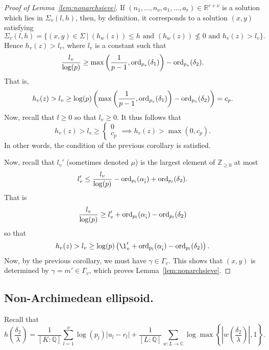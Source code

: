 \begin{proof}[Proof of Lemma~\ref{lem:nonarchsieve}]
If $(n_1, \dots, n_{\nu}, a_1, \dots, a_r) \in \mathbb{R}^{r+\nu}$ is a solution which lies in $\Sigma_v(l,h)$, then, by definition, it corresponds to a solution $(x,y)$ satisfying
\[\Sigma_v(l,h) = \{(x,y) \in \Sigma \ | \ (h_w(z))\leq h \text{ and }  (h_w(z))\nleq 0 \text{ and } h_v(z)>l_v\}.\]
Hence $h_v(z)>l_v$, where $l_v$ is a constant such that
\[\frac{l_v}{\log(p)} \geq \max\left( \frac{1}{p-1}, \operatorname{ord}_{p_v}(\delta_1)\right) - \operatorname{ord}_{p_v}(\delta_2).\]
That is, 
\[h_v(z) > l_v \geq \log(p)\left(\max\left( \frac{1}{p-1}, \operatorname{ord}_{p_v}(\delta_1)\right) - \operatorname{ord}_{p_v}(\delta_2)\right) = c_p.\]
Now, recall that $l \geq 0$ so that $l_v \geq 0$. It thus follows that 
\[h_v(z) > l_v \geq
\begin{cases}
0\\
c_p
\end{cases}
\implies h_v(z) >\max(0,c_p).\]
In other words, the condition of the previous corollary is satisfied. 

Now, recall that $l_v'$ (sometimes denoted $\mu$) is the largest element of $\mathbb{Z}_{\geq 0}$ at most
\[l_v' \leq \frac{l_v}{\log(p)} - \operatorname{ord}_{p_l}(\alpha_{\hat{i}}) + \operatorname{ord}_{p_l}(\delta_2).\]
That is
\[\frac{l_v}{\log(p)} \geq l_v' + \operatorname{ord}_{p_l}(\alpha_{\hat{i}}) - \operatorname{ord}_{p_l}(\delta_2)\]
so that
\[h_v(z) > l_v \geq \log(p)\left(\l_v' + \ord_{p_l}(\alpha_{\hat{i}}) - \ord_{p_l}(\delta_2)\right).\]
Now, by the previous corollary, we must have $\gamma \in \Gamma_v$. This shows that $(x,y)$ is determined by $\gamma=m'\in\Gamma_v$, which proves Lemma~\ref{lem:nonarchsieve}.
%
\end{proof}


\subsection{Non-Archimedean ellipsoid.} 
Recall that
\[h\left(\frac{\delta_2}{\lambda}\right) =  \frac{1}{[K:\mathbb{Q}]}\sum_{l = 1}^{\nu} \log(p_l)|u_l - r_l| + \frac{1}{[L:\mathbb{Q}]}\sum_{w :L \to \mathbb{C}} \log \max \left\{ \left|w\left(\frac{\delta_2}{\lambda}\right)\right|, 1\right\}.\]

